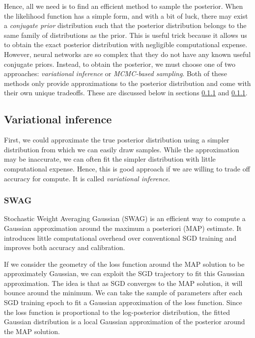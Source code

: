 \documentclass[12pt]{article}
\begin{document}
Hence, all we need is to find an efficient method to sample the posterior. When the likelihood function has a simple form, and with a bit of luck, there may exist a \textit{conjugate prior} distribution such that the posterior distribution belongs to the same family of distributions as the prior. This is useful trick because it allows us to obtain the exact posterior distribution with negligible computational expense. However, neural networks are so complex that they do not have any known useful conjugate priors. Instead, to obtain the posterior, we must choose one of two approaches: \textit{variational inference} or \textit{MCMC-based sampling}. Both of these methods only provide approximations to the posterior distribution and come with their own unique tradeoffs. These are discussed below in sections \ref{} and \ref{}.

\subsection{Variational inference}

First, we could approximate the true posterior distribution using a simpler distribution from which we can easily draw samples. While the approximation may be inaccurate, we can often fit the simpler distribution with little computational expense. Hence, this is good approach if we are willing to trade off accuracy for compute. It is called \textit{variational inference}.

\subsubsection{SWAG}

Stochastic Weight Averaging Gaussian (SWAG) is an efficient way to compute a Gaussian approximation around the maximum a posteriori (MAP) estimate. \cite{swag} It introduces little computational overhead over conventional SGD training and improves both accuracy and calibration. \cite{swag}

If we consider the geometry of the loss function around the MAP solution to be approximately Gaussian, we can exploit the SGD trajectory to fit this Gaussian approximation. The idea is that as SGD converges to the MAP solution, it will bounce around the minimum. We can take the sample of parameters after each SGD training epoch to fit a Gaussian approximation of the loss function. Since the loss function is proportional to the log-posterior distribution, the fitted Gaussian distribution is a local Gaussian approximation of the posterior around the MAP solution.
\end{document}
